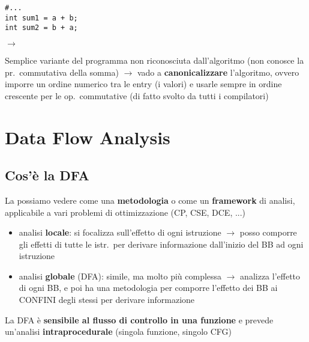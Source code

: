 \noindent\begin{minipage}[c]{.3\textwidth}
\begin{lstlisting}
#...
int sum1 = a + b;
int sum2 = b + a;\end{lstlisting}
\end{minipage}\hfill $\rightarrow$
\begin{minipage}[c]{.65\textwidth}
Semplice variante del programma non riconosciuta dall'algoritmo (non conosce la pr.~commutativa della somma) $\rightarrow$ vado a \textbf{canonicalizzare} l'algoritmo, ovvero imporre un ordine numerico tra le entry (i valori) e usarle sempre in ordine crescente per le op.~commutative (di fatto svolto da tutti i compilatori)
\end{minipage}

\section{Data Flow Analysis}

\subsection{Cos'\`e la DFA}

La possiamo vedere come una \textbf{metodologia} o come un \textbf{framework} di analisi, applicabile a vari problemi di ottimizzazione (CP, CSE, DCE, ...)

\begin{itemize}
  \item analisi \textbf{locale}: si focalizza sull'effetto di ogni istruzione $\rightarrow$ posso comporre gli effetti di tutte le istr.~per derivare informazione dall'inizio del BB ad ogni istruzione
  \item analisi \textbf{globale} (DFA): simile, ma molto pi\`u complessa $\rightarrow$ analizza l'effetto di ogni BB, e poi ha una metodologia per comporre l'effetto dei BB ai CONFINI degli stessi per derivare informazione
\end{itemize}

La DFA \`e \textbf{sensibile al flusso di controllo in una funzione} e prevede un'analisi \textbf{intraprocedurale} (singola funzione, singolo CFG)

